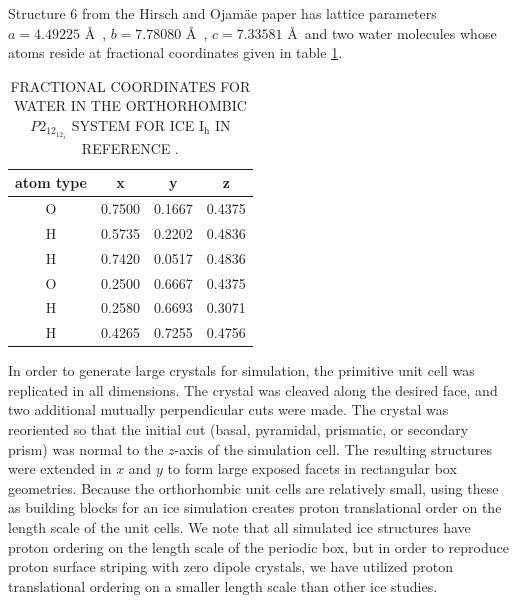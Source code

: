 Structure 6 from the Hirsch and Ojam\"{a}e paper has lattice
parameters $a = 4.49225$ \AA\ , $b = 7.78080$ \AA\ , $c = 7.33581$
\AA\ and two water molecules whose atoms reside at fractional
coordinates given in table
\ref{tab:p212121}. 

\begin{table}[h]
\centering
  \caption{FRACTIONAL COORDINATES FOR WATER IN THE ORTHORHOMBIC
    $P2_12_12_1$ SYSTEM FOR ICE I$_\mathrm{h}$ IN REFERENCE  \protect\citep{Hirsch04}.}
\label{tab:p212121}
\begin{tabular}{|cccc|}  \hline
atom type & x & y & z \\ \hline
 O & 0.7500 & 0.1667 & 0.4375 \\
 H & 0.5735 & 0.2202 & 0.4836 \\
 H & 0.7420 & 0.0517 & 0.4836 \\
 O & 0.2500 & 0.6667 & 0.4375 \\
 H & 0.2580 & 0.6693 & 0.3071 \\
 H & 0.4265 & 0.7255 & 0.4756 \\ \hline
\end{tabular}
\end{table}


In order to generate large crystals for simulation, the primitive unit
cell was replicated in all dimensions. The crystal was cleaved along
the desired face, and two additional mutually perpendicular cuts were
made.  The crystal was reoriented so that the initial cut (basal,
pyramidal, prismatic, or secondary prism) was normal to the $z$-axis
of the simulation cell.  The resulting structures were extended in $x$
and $y$ to form large exposed facets in rectangular box geometries.
Because the orthorhombic unit cells are relatively small, using these
as building blocks for an ice simulation creates proton translational
order on the length scale of the unit cells. We note that all
simulated ice structures have proton ordering on the length scale of
the periodic box, but in order to reproduce proton surface striping
with zero dipole crystals, we have utilized proton translational
ordering on a smaller length scale than other ice studies.

